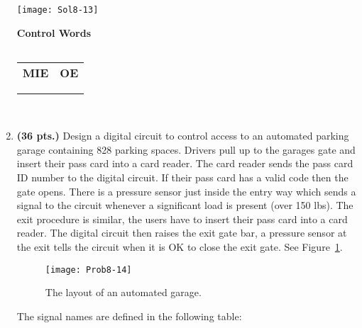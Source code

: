\begin{enumerate}
\begin{onlysolution}[fragile]
            \texttt{[image: Sol8-13]}

            \textbf{Control Words}

            \begin{tabular}{c}
            \end{tabular}

            \begin{tabular}{cc}
                \textbf{MIE} & \textbf{OE} \\
                {$
                    \begin{aligned}
                \end{aligned}$} &
                {$
                    \begin{aligned}
                \end{aligned}$}
            \end{tabular}\\
        \end{onlysolution}
    \item \textbf{ (36 pts.)}
        Design a digital circuit to control access to an
        automated parking garage containing 828 parking spaces.
        Drivers pull up to the garages gate and insert
        their pass card into a card reader.  The card reader sends the pass card
        ID number to the digital circuit.  If their pass card has a valid
        code then the gate opens.  There is a pressure sensor just inside the
        entry way which sends a signal to the circuit whenever a significant
        load is present (over 150 lbs).
        The exit procedure is similar, the users have to insert their pass card
        into a card reader.  The digital circuit then raises the exit gate bar,
        a pressure sensor at the exit tells the circuit when it is OK to close
        the exit gate.  See Figure~\ref{fig:Garage}.
        \begin{figure}[ht]
            \texttt{[image: Prob8-14]}
            \caption{The layout of an automated garage.}
            \label{fig:Garage}
        \end{figure}

        The signal names are defined in the following table:


\end{enumerate}
